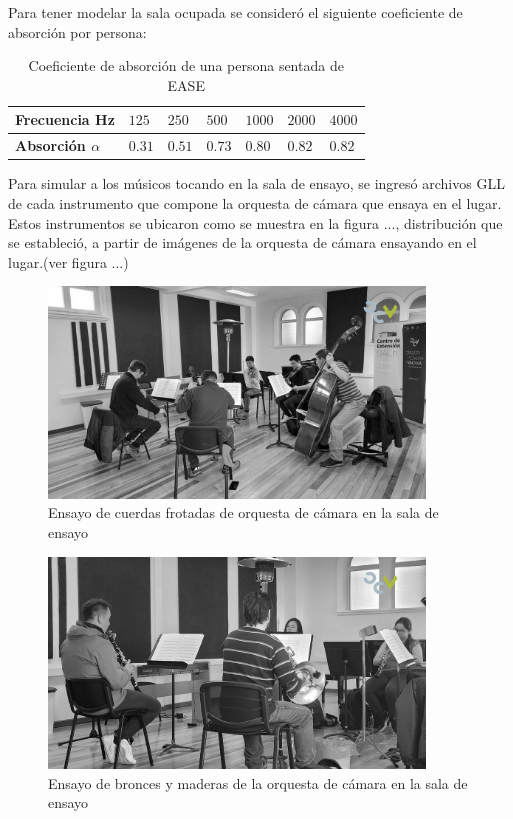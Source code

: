 \noindent Para tener modelar la sala ocupada se consideró el siguiente coeficiente de absorción por persona:
\begin{table}[H]
    \centering
    \caption{Coeficiente de absorción de una persona sentada de EASE}
    \label{tab: coef abs persona}
    \begin{tabular}{|l|l|l|l|l|l|l|}
    \hline
    \textbf{Frecuencia Hz}      & $125$  & $250$  & $500$  & $1000$ & $2000$ & $4000$ \\ \hline
    \textbf{Absorción $\alpha$} & $0.31$ & $0.51$ & $0.73$ & $0.80$ & $0.82$ & $0.82$ \\ \hline
    \end{tabular}
\end{table}

\noindent Para simular a los músicos tocando en la sala de ensayo, se ingresó archivos GLL de
cada instrumento que compone la orquesta de cámara que ensaya en el lugar.\cite{ackermann2023database}
Estos instrumentos se ubicaron como se muestra en la figura ..., distribución que se estableció,
a partir de imágenes de la orquesta de cámara ensayando en el lugar.(ver figura ...)
\begin{figure}[H]
    \centering
    \includegraphics[width=10cm]{Imagenes/OCV/OCV cuerdas.jpg}
    \caption{Ensayo de cuerdas frotadas de orquesta de cámara en la sala de ensayo}
\end{figure}

\begin{figure}[H]
    \centering
    \includegraphics[width=10cm]{Imagenes/OCV/OCV vientos.jpg}
    \caption{Ensayo de bronces y maderas de la orquesta de cámara en la sala de ensayo}
\end{figure}